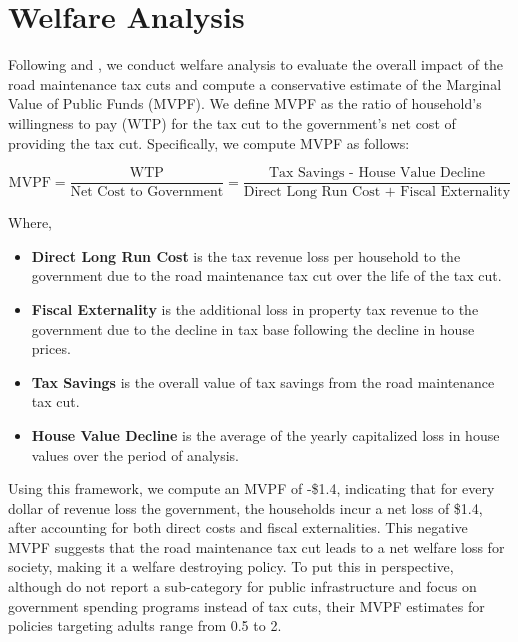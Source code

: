 \section{Welfare Analysis} \label{sec:mvpf}

Following \cite{hendren2020unified} and \cite{finkelstein2020welfare}, we conduct welfare analysis to evaluate the overall impact of the road maintenance tax cuts and compute a conservative estimate of the Marginal Value of Public Funds (MVPF). We define MVPF as the ratio of household's willingness to pay (WTP) for the tax cut to the government's net cost of providing the tax cut. Specifically, we compute MVPF as follows:

\begin{equation}
    \text{MVPF} = \frac{\text{WTP}}{\text{Net Cost to Government}} = \frac{\text{Tax Savings - House Value Decline}}{\text{Direct Long Run Cost + Fiscal Externality}}
\end{equation}

Where,
\begin{itemize}
    \item \textbf{Direct Long Run Cost} is the tax revenue loss per household to the government due to the road maintenance tax cut over the life of the tax cut.
    \item \textbf{Fiscal Externality} is the additional loss in property tax revenue to the government due to the decline in tax base following the decline in house prices.
    \item \textbf{Tax Savings} is the overall value of tax savings from the road maintenance tax cut.
    \item \textbf{House Value Decline} is the average of the yearly capitalized loss in house values over the period of analysis.  
\end{itemize}

Using this framework, we compute an MVPF of -\$1.4, indicating that for every dollar of revenue loss the government, the households incur a net loss of \$1.4, after accounting for both direct costs and fiscal externalities. This negative MVPF suggests that the road maintenance tax cut leads to a net welfare loss for society, making it a welfare destroying policy. To put this in perspective, although \cite{hendren2020unified} do not report a sub-category for public infrastructure and focus on government spending programs instead of tax cuts, their MVPF estimates for policies targeting adults range from 0.5 to 2.

